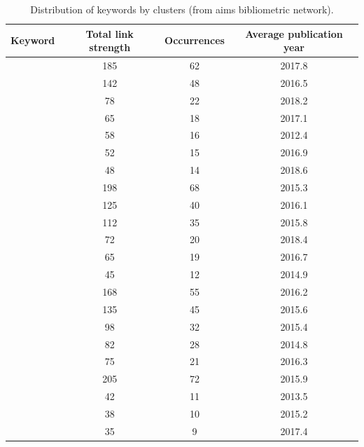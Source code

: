 \documentclass[a4paper,fleqn]{cas-sc}
\begin{document}
\begin{table}[ht]
\caption{Distribution of keywords by clusters (from aims bibliometric network).}
\label{maptable}
\setlength \tabcolsep {0.25\tabcolsep }

\begin{tabular}{|l|c|c|c|}
\hline
\hfill \textbf{Keyword} & \textbf{Total link strength} & \textbf{Occurrences} & \textbf{Average publication year}\\ \hline
\cellcolor{red!35}{gamification} & 185 & 62 & 2017.8 \\
\cellcolor{red!35}{history learning} & 142 & 48 & 2016.5 \\
\cellcolor{red!35}{augmented reality} & 78 & 22 & 2018.2 \\
\cellcolor{red!35}{mobile game} & 65 & 18 & 2017.1 \\
\cellcolor{red!35}{computer game} & 58 & 16 & 2012.4 \\
\cellcolor{red!35}{motivation} & 52 & 15 & 2016.9 \\
\cellcolor{red!35}{engagement} & 48 & 14 & 2018.6 \\ \hline
\cellcolor{green!35}{game-based learning} & 198 & 68 & 2015.3 \\
\cellcolor{green!35}{educational game} & 125 & 40 & 2016.1 \\
\cellcolor{green!35}{serious game} & 112 & 35 & 2015.8 \\
\cellcolor{green!35}{virtual reality} & 72 & 20 & 2018.4 \\
\cellcolor{green!35}{game design} & 65 & 19 & 2016.7 \\
\cellcolor{green!35}{three-dimensional computer graphics} & 45 & 12 & 2014.9 \\ \hline
\cellcolor{blue!30}{student} & 168 & 55 & 2016.2 \\
\cellcolor{blue!30}{education} & 135 & 45 & 2015.6 \\
\cellcolor{blue!30}{learning} & 98 & 32 & 2015.4 \\
\cellcolor{blue!30}{teaching} & 82 & 28 & 2014.8 \\ \hline
\cellcolor{purple!30}{video game} & 75 & 21 & 2016.3 \\
\cellcolor{purple!30}{history} & 205 & 72 & 2015.9 \\ \hline
\cellcolor{yellow!50}{interactive computer graphics} & 42 & 11 & 2013.5 \\
\cellcolor{yellow!50}{human computer interaction} & 38 & 10 & 2015.2 \\
\cellcolor{yellow!50}{learning environment} & 35 & 9 & 2017.4 \\ \hline
\end{tabular}
\label{aims_table}
\end{table}
\end{document}
